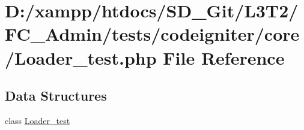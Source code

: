 \hypertarget{_loader__test_8php}{}\section{D\+:/xampp/htdocs/\+S\+D\+\_\+\+Git/\+L3\+T2/\+F\+C\+\_\+\+Admin/tests/codeigniter/core/\+Loader\+\_\+test.php File Reference}
\label{_loader__test_8php}
\subsection*{Data Structures}
\begin{DoxyCompactItemize}
\item 
class \hyperlink{class_loader__test}{Loader\+\_\+test}
\end{DoxyCompactItemize}
